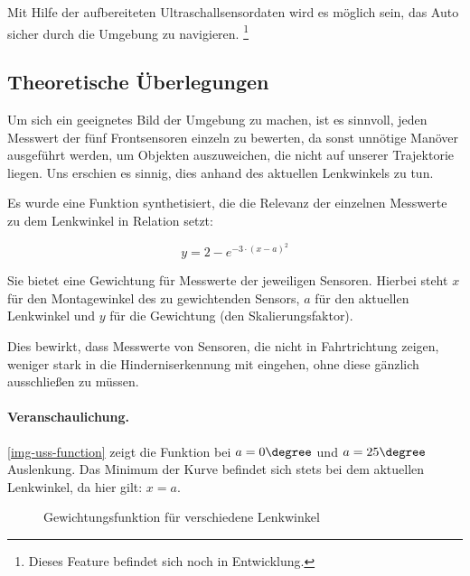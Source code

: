 \documentclass[a4paper,12pt]{report}
\begin{document}
	Mit Hilfe %
	der aufbereiteten Ultraschallsensordaten wird es möglich sein, das Auto sicher durch die Umgebung zu navigieren.
	\footnote{Dieses Feature befindet sich noch in Entwicklung.} %

\subsection{Theoretische Überlegungen}

	Um sich ein geeignetes Bild der Umgebung zu machen, ist es sinnvoll, jeden  Messwert der fünf Frontsensoren einzeln zu bewerten, da sonst unnötige Manöver ausgeführt werden, um Objekten auszuweichen, die nicht auf unserer Trajektorie liegen.
	Uns erschien es sinnig, dies anhand des aktuellen Lenkwinkels zu tun.

	Es wurde eine Funktion synthetisiert, die die Relevanz der einzelnen Messwerte zu dem Lenkwinkel in Relation setzt:

		\[y=2-e^{-3 \cdot \left( x-a \right)^2}\]

	Sie bietet eine Gewichtung für Messwerte der jeweiligen Sensoren.
	Hierbei steht $x$ für den Montagewinkel des zu gewichtenden Sensors, $a$ für den aktuellen Lenkwinkel und $y$ für die Gewichtung (den Skalierungsfaktor).

	Dies bewirkt, dass Messwerte von Sensoren, die nicht in Fahrtrichtung zeigen, weniger stark in die Hinderniserkennung mit eingehen, ohne diese gänzlich ausschließen zu müssen.

	\paragraph{Veranschaulichung.} \autoref{img-uss-function} zeigt die Funktion bei $a = 0\degree$ und $a = 25\degree$ Auslenkung.
	Das Minimum der Kurve befindet sich stets bei dem aktuellen Lenkwinkel, da hier gilt: $x = a$.

	\begin{figure}[ht]
		\centering

		\caption{Gewichtungsfunktion für verschiedene Lenkwinkel}
		\label{img-uss-function}
	\end{figure}
\end{document}
